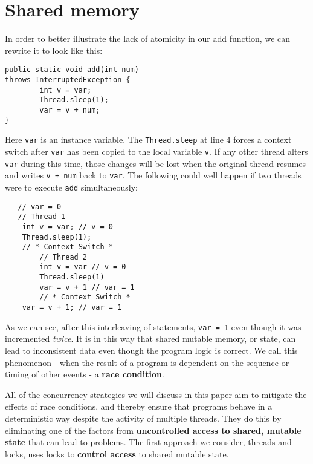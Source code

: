 \documentclass[a4paper,12pt]{kth-mag}
\begin{document}
\section{Shared memory}

In order to better illustrate the lack of atomicity in our add function, we can rewrite it to look like this:

\begin{listing}[H]
	\begin{verbatim}
public static void add(int num) 
throws InterruptedException {
        int v = var;
        Thread.sleep(1);
        var = v + num;
}
  	\end{verbatim}
\end{listing}

Here \texttt{var} is an instance variable. The \texttt{Thread.sleep} at line 4 forces a context switch after \texttt{var} has been copied to the local variable \texttt{v}. If any other thread alters \texttt{var} during this time, those changes will be lost when the original thread resumes and writes \texttt{v + num} back to \texttt{var}. The following could well happen if two threads were to execute \texttt{add} simultaneously:

\begin{listing}[H]
	\begin{verbatim}
   // var = 0
   // Thread 1
    int v = var; // v = 0
    Thread.sleep(1);
    // * Context Switch *
        // Thread 2
        int v = var // v = 0
        Thread.sleep(1)
        var = v + 1 // var = 1
        // * Context Switch *
    var = v + 1; // var = 1
  	\end{verbatim}
\end{listing}

As we can see, after this interleaving of statements, \texttt{var = 1} even though it was incremented \textit{twice}. It is in this way that shared mutable memory, or state, can lead to inconsistent data even though the program logic is correct. We call this phenomenon - when the result of a program is dependent on the sequence or timing of other events - a \textbf{race condition}.

All of the concurrency strategies we will discuss in this paper aim to mitigate the effects of race conditions, and thereby ensure that programs behave in a deterministic way despite the activity of multiple threads. They do this by eliminating one of the factors from \textbf{uncontrolled access to shared, mutable state} that can lead to problems. The first approach we consider, threads and locks, uses locks to \textbf{control access} to shared mutable state.
\end{document}
